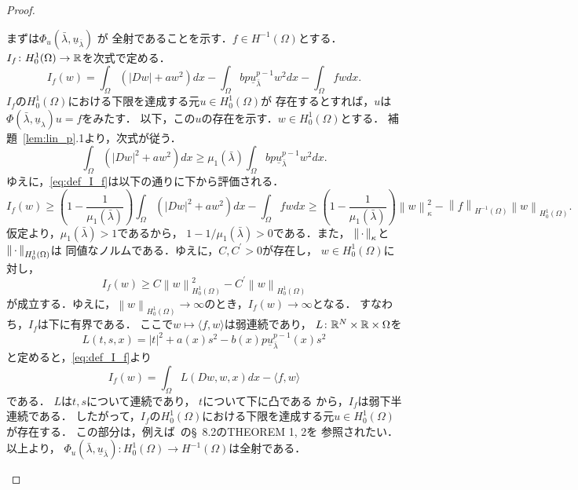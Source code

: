 \begin{proof}
\begin{enumerate}[1.]
        まずは$\Phi_u (\bar{\lambda}, \underline{u}_{\bar{\lambda}})$
        が
        全射であることを示す．$f \in H^{-1}(\Omega)$とする．
        $I_f \colon H_0^1(\Omega) \to \mathbb{R}$を次式で定める．
        \begin{equation}
         I_f (w) = \int_\Omega \left( \lvert Dw \rvert + aw^2 \right)
          dx - \int_\Omega bp \underline{u}_{\bar{\lambda}}^{p-1} w^2
          dx - \int_\Omega fw dx. \label{eq:def_I_f}
        \end{equation}
        $I_f$の$H_0^1(\Omega)$における下限を達成する元$u \in
        H_0^1(\Omega)$が
        存在するとすれば，$u$は$\Phi(\bar{\lambda},
        \underline{u}_\lambda)u = f$をみたす．
        以下，この$u$の存在を示す．$w \in H_0^1(\Omega)$とする．
        補題~\ref{lem:lin_p}.1より，次式が従う．
        \begin{equation}
         \int_\Omega \left( \lvert Dw \rvert^2 + aw^2 \right) dx \geq
          \mu_1(\bar{\lambda}) \int_\Omega bp
          \underline{u}_{\bar{\lambda}}^{p-1} w^2 dx.
          \label{eq:mu_1_bar_lambda_r} 
        \end{equation}
        ゆえに，\eqref{eq:def_I_f}は以下の通りに下から評価される．
        \[
         I_f(w) \geq \left( 1 - \frac{1}{\mu_1(\bar{\lambda})} \right)
        \int_\Omega \left( \lvert Dw \rvert^2 + aw^2\right) dx -
        \int_\Omega fw dx \geq \left( 1 -
        \frac{1}{\mu_1(\bar{\lambda})} \right) \left\| w
        \right\|_\kappa^2 - \left\| f \right\|_{H^{-1}(\Omega)}
        \left\| w \right\|_{H_0^1(\Omega)}.
        \]
        仮定より，$\mu_1(\bar{\lambda}) > 1$であるから，
        $1 - 1/\mu_1(\bar{\lambda}) > 0$である．また，
        $\left\|\, \cdot \, \right\|_\kappa$と$\left\|\, \cdot \, \right\|_{H_0^1(\Omega)}$は
        同値なノルムである．ゆえに，$C, C^\prime > 0$が存在し，
        $w \in H_0^1(\Omega)$に対し，
        \[
         I_f (w) \geq C \left\| w \right\|^2_{H_0^1(\Omega)} -
          C^\prime \left\| w \right\|_{H_0^1(\Omega)}          
        \]
        が成立する．ゆえに，$\left\| w \right\|_{H_0^1(\Omega)} \to
        \infty$のとき，$I_f(w) \to \infty$となる．
        すなわち，$I_f$は下に有界である．
        ここで$w \mapsto \langle f, w \rangle$は弱連続であり，
        $L \colon \mathbb{R}^N \times \mathbb{R} \times \Omega$を
        \[
         L(t, s, x) = \lvert t \rvert^2 + a(x)s^2 - b(x)p
        \underline{u}_{\bar{\lambda}}^{p-1}(x) s^2
        \]
        と定めると，\eqref{eq:def_I_f}より
        \[
         I_f (w) = \int_\Omega L(Dw, w, x) dx - \langle f , w \rangle
        \]
        である．
        $L$は$t, s$について連続であり，
        $t$について下に凸である
        から，$I_f$は弱下半連続である．
        したがって，$I_f$の$H_0^1(\Omega)$における下限を達成する元$u
        \in H_0^1(\Omega)$が存在する．
        この部分は，例えば~\cite{MR2597943}の\S~8.2のTHEOREM 1, 2を
        参照されたい．以上より，
        $\Phi_u (\bar{\lambda}, \underline{u}_{\bar{\lambda}}) \colon
        H_0^1(\Omega) \to H^{-1}(\Omega)$は全射である．
        

\end{enumerate}
\end{proof}

